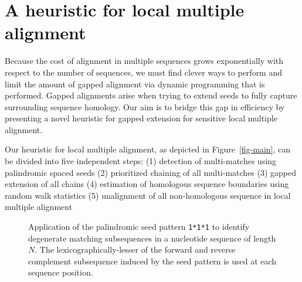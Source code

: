 \documentclass[twoside,11pt]{article}
\begin{document}
\section{A heuristic for local multiple alignment}
Because the cost of alignment in multiple sequences grows exponentially with respect to the number of sequences, we must find clever ways to perform and limit the amount of gapped alignment via dynamic programming that is performed. Gapped alignments arise when trying to extend seeds to fully capture surrounding sequence homology. Our aim is to bridge this gap in efficiency by presenting a novel heuristic for gapped extension for sensitive local multiple alignment.

Our heuristic for local multiple alignment, as depicted in Figure~\ref{fig-main},
can be divided into five independent steps:
(1) detection of multi-matches using palindromic spaced seeds
(2) prioritized chaining of all multi-matches
(3) gapped extension of all chains
(4) estimation of homologous sequence boundaries using random walk statistics
(5) unalignment of all non-homologous sequence in local multiple alignment

\begin{figure}[t]
\centering {}
\caption{Application of the palindromic seed pattern
\texttt{1*1*1} to identify degenerate matching subsequences in a
nucleotide sequence of length $N$. The lexicographically-lesser of
the forward and reverse complement subsequence induced by the seed
pattern is used at each sequence position.}

\label{fig-seeds}\vspace{-0.2cm}
\end{figure}
\end{document}
